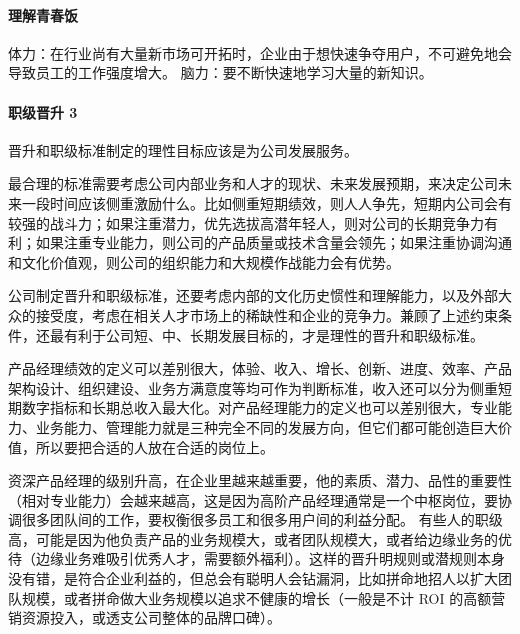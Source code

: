 \documentclass[letterpaper,10pt,english]{sphinxmanual}
\begin{document}
\paragraph{理解青春饭}
\label{\detokenize{chapter_introduction/career_path:id20}}
体力：在行业尚有大量新市场可开拓时，企业由于想快速争夺用户，不可避免地会导致员工的工作强度增大。
脑力：要不断快速地学习大量的新知识。%
\begin{footnote}[365]\sphinxAtStartFootnote
{}
%
\end{footnote}


\paragraph{职级晋升 3\sphinxfootnotemark[366]}
\label{\detokenize{chapter_introduction/career_path:id21}}%
\begin{footnotetext}[366]\sphinxAtStartFootnote
{}
%
\end{footnotetext}\ignorespaces 
晋升和职级标准制定的理性目标应该是为公司发展服务。

最合理的标准需要考虑公司内部业务和人才的现状、未来发展预期，来决定公司未来一段时间应该侧重激励什么。比如侧重短期绩效，则人人争先，短期内公司会有较强的战斗力；如果注重潜力，优先选拔高潜年轻人，则对公司的长期竞争力有利；如果注重专业能力，则公司的产品质量或技术含量会领先；如果注重协调沟通和文化价值观，则公司的组织能力和大规模作战能力会有优势。

公司制定晋升和职级标准，还要考虑内部的文化历史惯性和理解能力，以及外部大众的接受度，考虑在相关人才市场上的稀缺性和企业的竞争力。兼顾了上述约束条件，还最有利于公司短、中、长期发展目标的，才是理性的晋升和职级标准。

产品经理绩效的定义可以差别很大，体验、收入、增长、创新、进度、效率、产品架构设计、组织建设、业务方满意度等均可作为判断标准，收入还可以分为侧重短期数字指标和长期总收入最大化。对产品经理能力的定义也可以差别很大，专业能力、业务能力、管理能力就是三种完全不同的发展方向，但它们都可能创造巨大价值，所以要把合适的人放在合适的岗位上。

资深产品经理的级别升高，在企业里越来越重要，他的素质、潜力、品性的重要性（相对专业能力）会越来越高，这是因为高阶产品经理通常是一个中枢岗位，要协调很多团队间的工作，要权衡很多员工和很多用户间的利益分配。
有些人的职级高，可能是因为他负责产品的业务规模大，或者团队规模大，或者给边缘业务的优待（边缘业务难吸引优秀人才，需要额外福利）。这样的晋升明规则或潜规则本身没有错，是符合企业利益的，但总会有聪明人会钻漏洞，比如拼命地招人以扩大团队规模，或者拼命做大业务规模以追求不健康的增长（一般是不计
ROI 的高额营销资源投入，或透支公司整体的品牌口碑）。
\end{document}
